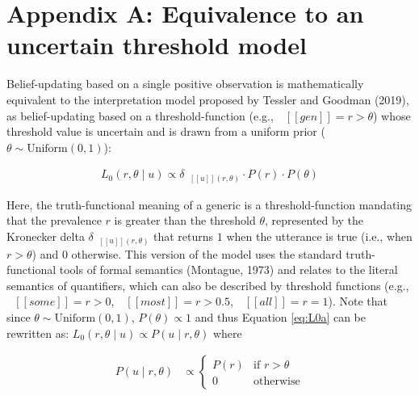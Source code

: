 \documentclass[floatsintext,doc]{apa6}
\begin{document}
\newpage
\section{Appendix A: Equivalence to an uncertain threshold model}

Belief-updating based on a single positive observation is mathematically equivalent to the interpretation model proposed by Tessler and Goodman (2019), as belief-updating based on a threshold-function (e.g., \(\mbox{ $[\![ gen ]\!]$} = r > \theta\)) whose threshold value is uncertain and is drawn from a uniform prior (\(\theta \sim \text{Uniform}(0, 1)\)):

\begin{align}
L_0(r, \theta \mid u) \propto {\delta_{\mbox{ $[\![ u ]\!]$}(r, \theta)} \cdot P(r) \cdot P(\theta)} \label{eq:L0a}
\end{align}

Here, the truth-functional meaning of a generic is a threshold-function mandating that the prevalence \(r\) is greater than the threshold \(\theta\), represented by the Kronecker delta \(\delta_{\mbox{ $[\![ u ]\!]$}(r, \theta)}\) that returns \(1\) when the utterance is true (i.e., when \(r > \theta\)) and \(0\) otherwise.
%
%
This version of the model uses the standard truth-functional tools of formal semantics (Montague, 1973) and relates to the literal semantics of quantifiers, which can also be described by threshold functions (e.g., \(\mbox{ $[\![ some ]\!]$} = r > 0\), \(\mbox{ $[\![ most ]\!]$} = r > 0.5\), \(\mbox{ $[\![ all ]\!]$} = r = 1\)).
Note that since \(\theta \sim \text{Uniform}(0, 1)\),  \(P(\theta) \propto 1\)  and thus Equation \ref{eq:L0a} can be rewritten as: \(L_0(r, \theta \mid u) \propto P(u \mid r, \theta)\) where

\begin{align}
P(u \mid r, \theta)  &\propto \begin{cases}
P(r) & \text{if } r > \theta \\
0 & \text{otherwise} \end{cases} \label{eq:delta2}
\end{align}
\end{document}
